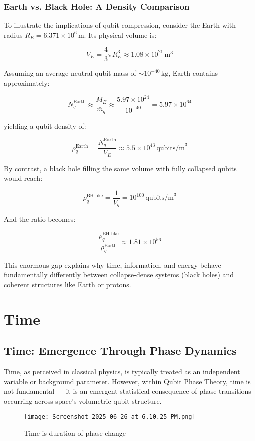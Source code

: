 \documentclass[12pt]{report} %
\begin{document}
\subsection{Earth vs. Black Hole: A Density Comparison}

To illustrate the implications of qubit compression, consider the Earth with radius \( R_E = 6.371 \times 10^6 \, \text{m} \). Its physical volume is:

\[
V_E = \frac{4}{3} \pi R_E^3 \approx 1.08 \times 10^{21} \, \text{m}^3
\]

Assuming an average neutral qubit mass of \( \sim 10^{-40} \, \text{kg} \), Earth contains approximately:

\[
N_q^{\text{Earth}} \approx \frac{M_E}{\bar{m}_q} \approx \frac{5.97 \times 10^{24}}{10^{-40}} = 5.97 \times 10^{64}
\]

yielding a qubit density of:

\[
\rho_q^{\text{Earth}} = \frac{N_q^{\text{Earth}}}{V_E} \approx 5.5 \times 10^{43} \, \text{qubits/m}^3
\]

By contrast, a black hole filling the same volume with fully collapsed qubits would reach:

\[
\rho_q^{\text{BH-like}} = \frac{1}{V_q} = 10^{100} \, \text{qubits/m}^3
\]

And the ratio becomes:

\[
\frac{\rho_q^{\text{BH-like}}}{\rho_q^{\text{Earth}}} \approx 1.81 \times 10^{56}
\]

This enormous gap explains why time, information, and energy behave fundamentally differently between collapse-dense systems (black holes) and coherent structures like Earth or protons.


\newpage
\chapter{Time}


\section{Time: Emergence Through Phase Dynamics}

Time, as perceived in classical physics, is typically treated as an independent variable or background parameter. However, within Qubit Phase Theory, time is not fundamental — it is an emergent statistical consequence of phase transitions occurring across space's volumetric qubit structure.
\begin{figure}[H]
    \centering
    \texttt{[image: Screenshot 2025-06-26 at 6.10.25 PM.png]}
    \caption{Time is duration of phase change}
    \label{fig:enter-label}
\end{figure}
\end{document}
